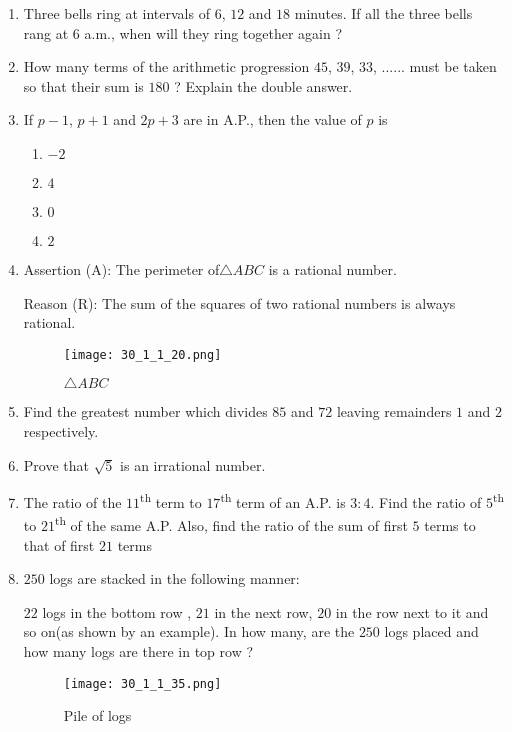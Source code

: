 \documentclass[12pt]{article}
\begin{document}
\begin{enumerate}
        \item Three bells ring at intervals of $6$, $12$ and $18$ minutes. If all the three bells rang at $6$ a.m., when will they ring together again ?
    \item How many terms of the arithmetic progression $45$, $39$, $33$, ...... must be taken so that their sum is $180$ ? Explain the double answer.
    \item If $p-1$, $p+1$ and $2p+3$ are in A.P., then the value of $p$ is
        \begin{enumerate}[label=(\alph*)]
      \item $-2$
      \item $4$
      \item $0$
      \item $2$
      \end{enumerate}
    \item Assertion (A):  The perimeter of$\triangle ABC$ is a rational number.
    
    Reason (R): The sum of the squares of two rational numbers is always rational.
    \begin{figure}[H]
        \centering
        \texttt{[image: 30\_1\_1\_20.png]}
        \caption{$\triangle ABC$}
        \label{fig:figure1}
    \end{figure}
    \item Find the greatest number which divides $85$ and $72$ leaving remainders $1$ and $2$ respectively.
    \item Prove that $\sqrt{5}$ is an irrational number.
        \item The ratio of the $11$\textsuperscript{th} term to $17$\textsuperscript{th} term of an A.P. is $3:4$. Find the ratio of $5$\textsuperscript{th} to $21$\textsuperscript{th} of the same A.P. Also, find the ratio of the sum of first $5$ terms to that of first $21$ terms
        \item $250$ logs are stacked in the following manner:
        
        $22$ logs in the bottom row , $21$ in the next row, $20$ in the row next to it and so on(as shown by an example). In how many, are the $250$ logs placed and how many logs are there in top row ?
         \begin{figure}[H]
             \centering
             \texttt{[image: 30\_1\_1\_35.png]}
             \caption{Pile of logs}
             \label{fig:figure2}
         \end{figure}
\end{enumerate}
\end{document}
